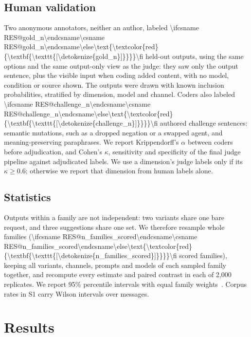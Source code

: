\documentclass{ceurart}
\makeatletter
\newcommand{\RES}[1]{\ifcsname RES@#1\endcsname\csname RES@#1\endcsname\else\RESmissing{#1}\fi}
\newcommand{\RESmissing}[1]{\text{\textcolor{red}{\textbf{\texttt{[\detokenize{#1}]}}}}}
\makeatother
\begin{document}
\subsection{Human validation}
Two anonymous annotators, neither an author, labeled \num{\RES{gold_n}} held-out outputs, using the same options and the same output-only view as the judge: they saw only the output sentence, plus the visible input when coding added content, with no model, condition or source shown. %
The outputs were drawn with known inclusion probabilities, stratified by dimension, model and channel. %
Coders also labeled \num{\RES{challenge_n}} authored challenge sentences: semantic mutations, such as a dropped negation or a swapped agent, and meaning-preserving paraphrases. %
We report Krippendorff's $\alpha$ between coders before adjudication, and Cohen's $\kappa$, sensitivity and specificity of the final judge pipeline against adjudicated labels. %
We use a dimension's judge labels only if its $\kappa \geq 0.6$; otherwise we report that dimension from human labels alone. %

\subsection{Statistics}
Outputs within a family are not independent: two variants share one bare request, and three suggestions share one set.
We therefore resample whole families (\num{\RES{n_families_scored}} scored families), keeping all variants, channels, prompts and models of each sampled family together, and recompute every estimate and paired contrast in each of 2,000 replicates. %
We report 95\% percentile intervals with equal family weights~\cite{saravanan2020hierarchical}.
Corpus rates in S1 carry Wilson intervals over messages.

\section{Results}
\end{document}
